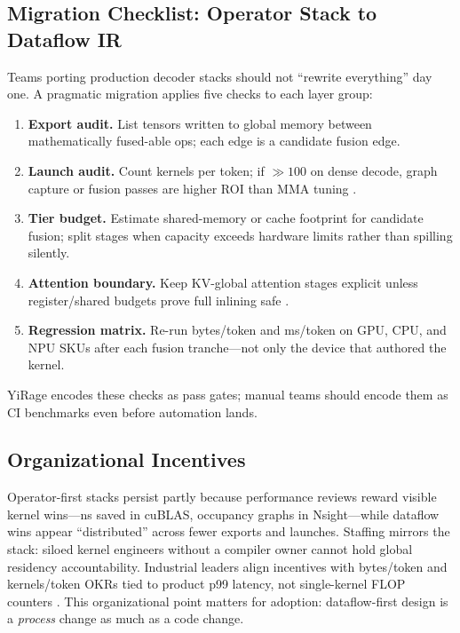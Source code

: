 \subsection{Migration Checklist: Operator Stack to Dataflow IR}
\label{sec:migration_checklist}

Teams porting production decoder stacks should not ``rewrite everything'' day one.
A pragmatic migration applies five checks to each layer group:
\begin{enumerate}
\item \textbf{Export audit.} List tensors written to global memory between mathematically fused-able ops; each edge is a candidate fusion edge.
\item \textbf{Launch audit.} Count kernels per token; if ${\gg}100$ on dense decode, graph capture or fusion passes are higher ROI than MMA tuning \citep{taxbreak2026}.
\item \textbf{Tier budget.} Estimate shared-memory or cache footprint for candidate fusion; split stages when capacity exceeds hardware limits rather than spilling silently.
\item \textbf{Attention boundary.} Keep KV-global attention stages explicit unless register/shared budgets prove full inlining safe \citep{dao2023flashdecoding,dao2022flashattention}.
\item \textbf{Regression matrix.} Re-run bytes/token and ms/token on GPU, CPU, and NPU SKUs after each fusion tranche---not only the device that authored the kernel.
\end{enumerate}
YiRage encodes these checks as pass gates; manual teams should encode them as CI benchmarks even before automation lands.

\subsection{Organizational Incentives}
\label{sec:org_incentives}

Operator-first stacks persist partly because performance reviews reward visible kernel wins---ns saved in cuBLAS, occupancy graphs in Nsight---while dataflow wins appear ``distributed'' across fewer exports and launches.
Staffing mirrors the stack: siloed kernel engineers without a compiler owner cannot hold global residency accountability.
Industrial leaders align incentives with bytes/token and kernels/token OKRs tied to product p99 latency, not single-kernel FLOP counters \citep{memoryfloor2026,taxbreak2026}.
This organizational point matters for adoption: dataflow-first design is a \emph{process} change as much as a code change.

